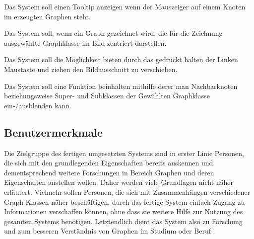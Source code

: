 \documentclass[11pt,a4paper]{article}
\begin{document}
\begin{description}[leftmargin=.9cm]
\item[18] Das System soll einen Tooltip anzeigen wenn der Mauszeiger auf einem Knoten im erzeugten Graphen steht.
\item[19] Das System soll, wenn ein Graph gezeichnet wird, die für die Zeichnung ausgewählte Graphklasse im Bild zentriert darstellen.
\item[20] Das System soll die Möglichkeit bieten durch das gedrückt halten der Linken Maustaste und ziehen den Bildausschnitt zu verschieben.
\item[21] Das System soll eine Funktion beinhalten mithilfe derer man Nachbarknoten beziehungsweise Super- und Subklassen der Gewählten Graphklasse ein-/ausblenden kann.

\end{description}
     
    \subsection{Benutzermerkmale} %
	Die Zielgruppe des fertigen umgesetzten Systems sind in erster Linie Personen, die sich mit den grundlegenden Eigenschaften bereits auskennen und dementsprechend weitere Forschungen in Bereich Graphen und deren Eigenschaften anstellen wollen. Daher werden viele Grundlagen nicht näher erläutert. Vielmehr sollen Personen, die sich mit Zusammenhängen verschiedener Graph-Klassen näher beschäftigen, durch das fertige System einfach Zugang zu Informationen verschaffen können, ohne dass sie weitere Hilfe zur Nutzung des gesamten Systems benötigen.
	Letztendlich dient das System also zu Forschung und zum besseren Verständnis von Graphen im Studium oder Beruf .
\end{document}

